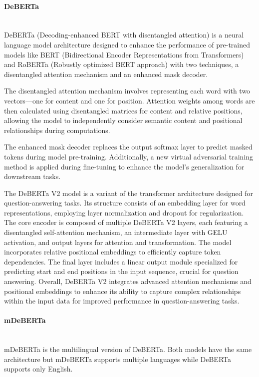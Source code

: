 \documentclass[12pt,oneside,openright,a4paper]{cpe-english-project}
\begin{document}
        \paragraph{DeBERTa}\mbox{}\\
          \null \qquad DeBERTa (Decoding-enhanced BERT with disentangled attention) is a neural language model architecture designed to enhance the performance of pre-trained models like BERT (Bidirectional Encoder Representations from Transformers) and RoBERTa (Robustly optimized BERT approach) with two techniques, a disentangled attention mechanism and an enhanced mask decoder.\par
          \qquad The disentangled attention mechanism involves representing each word with two vectors—one for content and one for position. Attention weights among words are then calculated using disentangled matrices for content and relative positions, allowing the model to independently consider semantic content and positional relationships during computations.\par
          \qquad The enhanced mask decoder replaces the output softmax layer to predict masked tokens during model pre-training. Additionally, a new virtual adversarial training method is applied during fine-tuning to enhance the model's generalization for downstream tasks.\par
          \qquad The DeBERTa V2 model is a variant of the transformer architecture designed for question-answering tasks. Its structure consists of an embedding layer for word representations, employing layer normalization and dropout for regularization. The core encoder is composed of multiple DeBERTa V2 layers, each featuring a disentangled self-attention mechanism, an intermediate layer with GELU activation, and output layers for attention and transformation. The model incorporates relative positional embeddings to efficiently capture token dependencies. The final layer includes a linear output module specialized for predicting start and end positions in the input sequence, crucial for question answering. Overall, DeBERTa V2 integrates advanced attention mechanisms and positional embeddings to enhance its ability to capture complex relationships within the input data for improved performance in question-answering tasks.\par
  
        \paragraph{mDeBERTa}\mbox{}\\
          \null \qquad mDeBERTa is the multilingual version of DeBERTa. Both models have the same architecture but mDeBERTa supports multiple languages while DeBERTa supports only English.\par
      
\end{document}
